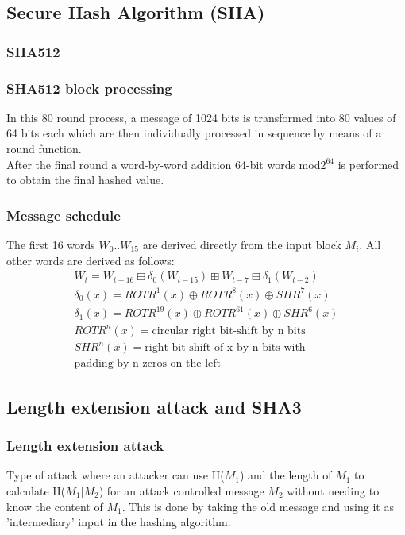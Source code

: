 \documentclass[12pt]{article}
\let\amssymbboxplus\boxplus
\renewcommand{\boxplus}{\mathbin{\mathop\amssymbboxplus}}
\begin{document}
 \subsection{Secure Hash Algorithm (SHA)}
 \subsubsection{SHA512}
 \subsubsection{SHA512 block processing}
 In this 80 round process, a message of 1024 bits is transformed into 80 values of 64 bits each which are then individually processed in sequence by means of a round function.\\
 After the final round a word-by-word addition 64-bit words mod$2^{64}$ is performed to obtain the final hashed value.
 \subsubsection{Message schedule}
 The first 16 words $W_0 .. W_{15}$ are derived directly from the input block $M_i$. All other words are derived as follows:
 \begin{align*}
 	W_t = W_{t-16} \boxplus \delta_0(W_{t-15}) \boxplus W_{t-7} \boxplus \delta_1(W_{t-2})\\
 	\delta_0(x) = ROTR^1(x) \oplus ROTR^8(x) \oplus SHR^7(x)\\
 	\delta_1(x) = ROTR^{19}(x) \oplus ROTR^{61}(x) \oplus SHR^6(x)\\
 	ROTR^n(x) = \text{circular right bit-shift by n bits}\\
 	SHR^n(x) = \text{right bit-shift of x by n bits with}\\
 	 \text{padding by n zeros on the left}
 \end{align*}
 
 \subsection{Length extension attack and SHA3}
 \subsubsection{Length extension attack}
 Type of attack where an attacker can use H($M_1$) and the length of $M_1$ to calculate H($M_1|M_2$) for an attack controlled message $M_2$ without needing to know the content of $M_1$. This is done by taking the old message and using it as 'intermediary' input in the hashing algorithm.
\end{document}
